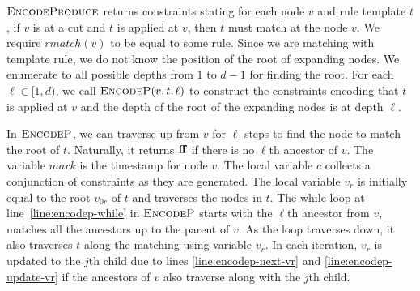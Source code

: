 $\textsc{EncodeProduce}$ returns constraints stating for each node $v$
and rule template $t$,
if $v$ is at a cut and $t$ is applied at $v$, then $t$ must match
at the node $v$.
We require $rmatch(v)$ to be equal to some rule.
Since we are matching with template rule, we do not know the
position of the root of expanding nodes.
We enumerate to all possible depths from $1$ to $d-1$ for finding
the root.
For each $\ell \in [1,d)$, we call $\textsc{EncodeP}( v, t, \ell)$
to construct the constraints encoding that $t$ is applied at $v$
and the depth of the root of the expanding nodes is at depth $\ell$.

In $\textsc{EncodeP}$, we can traverse up from $v$ for $\ell$ steps to
find the node to match the root of $t$.
Naturally, it returns $\mathbf{ff}$ if there
is no $\ell$th ancestor of $v$. %
The variable $mark$ is the timestamp for node $v$.
The local variable $c$ collects a conjunction of constraints as they are
generated. %
The local variable $v_r$ is initially equal to the root $v_{0r}$ of $t$
and traverses the nodes in $t$.
The while loop at line~\ref{line:encodep-while} in $\textsc{EncodeP}$ starts with
the $\ell$th ancestor from $v$,
matches all the ancestors up to the parent of $v$.
As the loop traverses down, it also traverses $t$ along the matching
using variable $v_r$.
In each iteration, $v_r$ is updated to the $j$th child due to lines
\ref{line:encodep-next-vr} and \ref{line:encodep-update-vr}
if the ancestors of $v$ also traverse along with the $j$th child.

